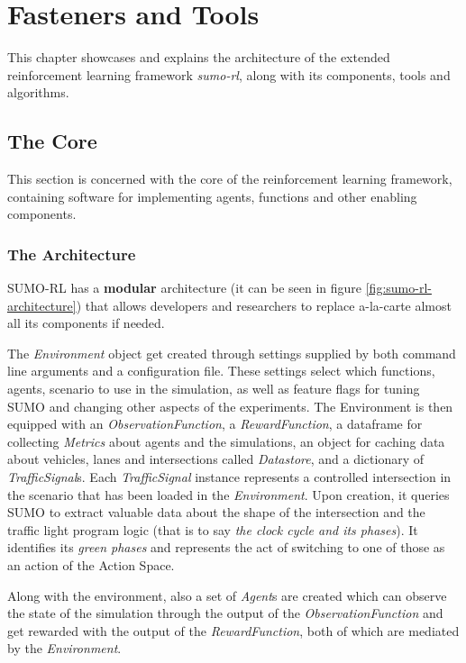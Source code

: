 \chapter{Fasteners and Tools}

This chapter showcases and explains the architecture of the extended reinforcement learning framework \textit{sumo-rl}, along with its components, tools and algorithms.

\section{The Core}

This section is concerned with the core of the reinforcement learning framework, containing software for implementing agents, functions and other enabling components.

\subsection{The Architecture}

SUMO-RL has a \textbf{modular} architecture (it can be seen in figure \ref{fig:sumo-rl-architecture}) that allows developers and researchers to replace a-la-carte almost all its components if needed.

The \textit{Environment} object get created through settings supplied by both command line arguments and a configuration file.
These settings select which functions, agents, scenario to use in the simulation, as well as feature flags for tuning SUMO and changing other aspects of the experiments.
The Environment is then equipped with an \textit{ObservationFunction}, a \textit{RewardFunction}, a dataframe for collecting \textit{Metrics} about agents and the simulations, an object for caching data about vehicles, lanes and intersections called \textit{Datastore}, and a dictionary of \textit{TrafficSignal}s.
Each \textit{TrafficSignal} instance represents a controlled intersection in the scenario that has been loaded in the \textit{Environment}. Upon creation, it queries SUMO to extract valuable data about the shape of the intersection and the traffic light program logic (that is to say \textit{the clock cycle and its phases}). It identifies its \textit{green phases} and represents the act of switching to one of those as an action of the Action Space.

Along with the environment, also a set of \textit{Agent}s are created which can observe the state of the simulation through the output of the \textit{ObservationFunction} and get rewarded with the output of the \textit{RewardFunction}, both of which are mediated by the \textit{Environment}.

